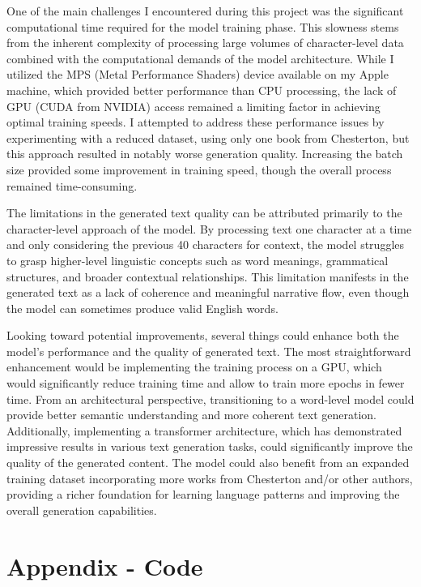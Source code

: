 \documentclass[12pt]{article}
\begin{document}
One of the main challenges I encountered during this project was the significant computational time required for the model training phase. This slowness stems from the inherent complexity of processing large volumes of character-level data combined with the computational demands of the model architecture. While I utilized the MPS (Metal Performance Shaders) device available on my Apple machine, which provided better performance than CPU processing, the lack of GPU (CUDA from NVIDIA) access remained a limiting factor in achieving optimal training speeds. I attempted to address these performance issues by experimenting with a reduced dataset, using only one book from Chesterton, but this approach resulted in notably worse generation quality. Increasing the batch size provided some improvement in training speed, though the overall process remained time-consuming.

The limitations in the generated text quality can be attributed primarily to the character-level approach of the model. By processing text one character at a time and only considering the previous 40 characters for context, the model struggles to grasp higher-level linguistic concepts such as word meanings, grammatical structures, and broader contextual relationships. This limitation manifests in the generated text as a lack of coherence and meaningful narrative flow, even though the model can sometimes produce valid English words.

Looking toward potential improvements, several things could enhance both the model's performance and the quality of generated text. The most straightforward enhancement would be implementing the training process on a GPU, which would significantly reduce training time and allow to train more epochs in fewer time. From an architectural perspective, transitioning to a word-level model could provide better semantic understanding and more coherent text generation. Additionally, implementing a transformer architecture, which has demonstrated impressive results in various text generation tasks, could significantly improve the quality of the generated content. The model could also benefit from an expanded training dataset incorporating more works from Chesterton and/or other authors, providing a richer foundation for learning language patterns and improving the overall generation capabilities.


\newpage

\section{Appendix - Code}
\end{document}
